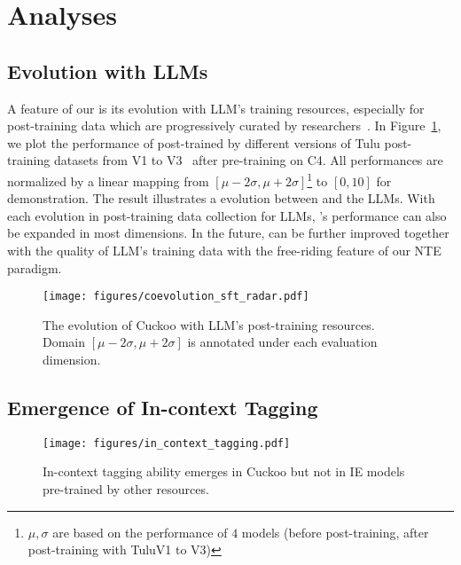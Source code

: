 \section{Analyses}

\subsection{Evolution with LLMs}

A feature of our \our is its evolution with LLM's training resources, especially for post-training data which are progressively curated by researchers~\citep{olmo,wizard_lm,tulu3}. In Figure~\ref{fig:coevolution_radar}, we plot the performance of \our post-trained by different versions of Tulu post-training datasets from V1 to V3~\citep{tulu,tulu2,tulu3} after pre-training on C4. All performances are normalized by a linear mapping from $[\mu-2\sigma, \mu+2\sigma]$\footnote{$\mu, \sigma$ are based on the performance of $4$ \our models (before post-training, after post-training with TuluV1 to V3)} to $[0, 10]$ for demonstration. The result illustrates a evolution between \our and the LLMs. With each evolution in post-training data collection for LLMs, \our's performance can also be expanded in most dimensions. In the future, \our can be further improved together with the quality of LLM's training data with the free-riding feature of our NTE paradigm. 

\begin{figure}
    \centering
    \texttt{[image: figures/coevolution\_sft\_radar.pdf]}
    \caption{The evolution of Cuckoo with LLM's post-training resources. Domain $[\mu-2\sigma, \mu+2\sigma]$ is annotated under each evaluation dimension.}
    \label{fig:coevolution_radar}
\end{figure}

\subsection{Emergence of In-context Tagging}

\begin{figure}
    \centering
    \texttt{[image: figures/in\_context\_tagging.pdf]}
    \caption{In-context tagging ability emerges in Cuckoo but not in IE models pre-trained by other resources.}
    \label{fig:ict}
\end{figure}

